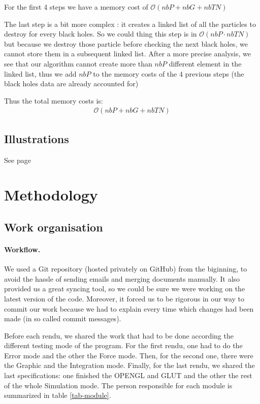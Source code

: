 \documentclass[a4paper]{article} %
\begin{document}
\begin{multicols*}{2}
For the first 4 steps we have a memory cost of $\mathcal{O}(nbP + nbG + nbTN)$

The last step is a bit more complex :
it creates a linked list of all the particles to destroy for every black holes.
So we could thing this step is in $\mathcal{O}(nbP \cdot nbTN)$ but because we destroy those particle before
checking the next black holes, we cannot store them in a subsequent linked list.
After a more precise analysis, we see that our algorithm cannot create more than $nbP$ different
element in the linked list, thus we add $nbP$ to the memory costs of the 4 previous steps
(the black holes data are already accounted for)

Thus the total memory costs is:
\begin{align}
\mathcal{O}(nbP + nbG + nbTN)
\end{align}


\subsection{Illustrations}
See page \pageref{lastpage}

\section{Methodology}
\subsection{Work organisation}

\paragraph{Workflow.} We used a Git repository (hosted privately on GitHub) from the biginning,
to avoid the hassle of sending emails and merging documents manually.
It also provided us a great syncing tool, so we could be sure we were working on
the latest version of the code.
Moreover, it forced us to be rigorous in our way to commit our work
because we had to explain every time which changes had been made
(in so called commit messages).

Before each rendu, we shared the work that had to be done
according the different testing mode of the program.
For the first rendu, one had to do the Error mode and the other the Force mode.
Then, for the second one, there were the Graphic and the Integration mode.
Finally, for the last rendu, we shared the last specifications:
one finished the OPENGL and GLUT
and the other the rest of the whole Simulation mode.
The person responsible for each module is summarized in table \ref{tab-module}.


\end{multicols*}
\end{document}
